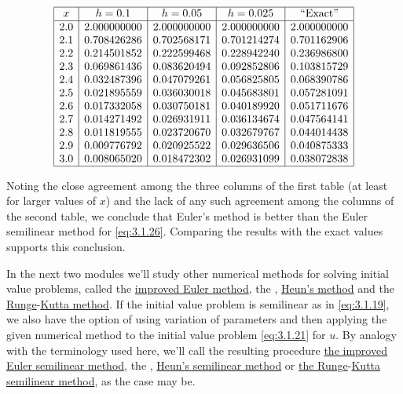 \documentclass{ximera}
\begin{document}
\begin{example}
$$
\begin{array}{|c|c|c|c|c|}
\hline
x&
h=0.1&
h=0.05&
h=0.025&
\text{``Exact''} \\ \hline
2.0 &2.000000000 & 2.000000000 & 2.000000000 & 2.000000000 \\
2.1 &0.708426286 & 0.702568171 & 0.701214274 & 0.701162906 \\
2.2 &0.214501852 & 0.222599468 & 0.228942240 & 0.236986800 \\
2.3 &0.069861436 & 0.083620494 & 0.092852806 & 0.103815729 \\
2.4 &0.032487396 & 0.047079261 & 0.056825805 & 0.068390786 \\
2.5 &0.021895559 & 0.036030018 & 0.045683801 & 0.057281091 \\
2.6 &0.017332058 & 0.030750181 & 0.040189920 & 0.051711676 \\
2.7 &0.014271492 & 0.026931911 & 0.036134674 & 0.047564141 \\
2.8 &0.011819555 & 0.023720670 & 0.032679767 & 0.044014438 \\
2.9 &0.009776792 & 0.020925522 & 0.029636506 & 0.040875333 \\
3.0 &0.008065020 & 0.018472302 & 0.026931099 & 0.038072838 \\
\hline
\end{array}
$$


Noting the close
agreement among the  three columns of the first table (at
least for larger values of $x$) and the lack of any such agreement
among the columns of the second table, we conclude that
Euler's method is better than the Euler semilinear method for
\eqref{eq:3.1.26}. Comparing the results with the exact values
supports this conclusion.
\end{example}

In the next two modules we'll study other numerical methods for
solving initial value problems,  called the
\href{http://www-history.mcs.st-and.ac.uk/Mathematicians/Euler.html}{improved Euler method}, the ,
\href{http://www-history.mcs.st-and.ac.uk/Mathematicians/Heun.html}{Heun's method}
and the
\href{http://www-history.mcs.st-and.ac.uk/Mathematicians/Runge.html}{Runge}-\href{http://www-history.mcs.st-and.ac.uk/Mathematicians/Kutta.html}{Kutta method}.
 If the initial value problem is semilinear as
in \eqref{eq:3.1.19},  we also have the option of using variation of
parameters and then applying the given numerical method to the initial
value problem \eqref{eq:3.1.21} for $u$. By analogy with the terminology
used here, we'll call the resulting procedure
\href{http://www-history.mcs.st-and.ac.uk/Mathematicians/Euler.html}{the improved Euler semilinear method}, the ,
\href{http://www-history.mcs.st-and.ac.uk/Mathematicians/Heun.html}{Heun's semilinear method} or
\href{http://www-history.mcs.st-and.ac.uk/Mathematicians/Runge.html}{the Runge}-\href{http://www-history.mcs.st-and.ac.uk/Mathematicians/Kutta.html}{Kutta semilinear method}, as
the case may be.
\end{document}
